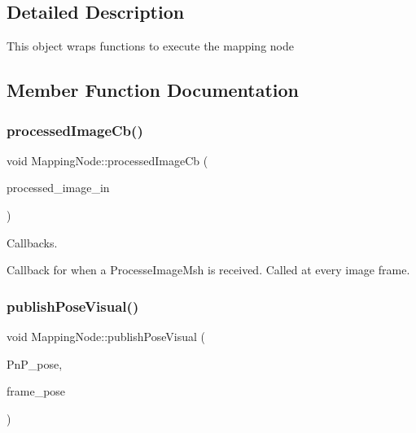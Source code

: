 \subsection{Detailed Description}
This object wraps functions to execute the mapping node 

\subsection{Member Function Documentation}
\mbox{\label{classMappingNode_aa5cfb0863500af4ec0dcb49b18b9f155}} 
\subsubsection{\texorpdfstring{processed\+Image\+Cb()}{processedImageCb()}}
{\footnotesize\ttfamily void Mapping\+Node\+::processed\+Image\+Cb (\begin{DoxyParamCaption}\item[{const ucl\+\_\+drone\+::\+Processed\+Image\+Msg\+::\+Const\+Ptr}]{processed\+\_\+image\+\_\+in }\end{DoxyParamCaption})\hspace{0.3cm}{\ttfamily [private]}}



Callbacks. 

Callback for when a Processe\+Image\+Msh is received. Called at every image frame. \mbox{\label{classMappingNode_a496131230fe880f4155bb8e0363014d6}} 
\subsubsection{\texorpdfstring{publish\+Pose\+Visual()}{publishPoseVisual()}}
{\footnotesize\ttfamily void Mapping\+Node\+::publish\+Pose\+Visual (\begin{DoxyParamCaption}\item[{ucl\+\_\+drone\+::\+Pose3D}]{Pn\+P\+\_\+pose,  }\item[{ucl\+\_\+drone\+::\+Pose3D}]{frame\+\_\+pose }\end{DoxyParamCaption})}


